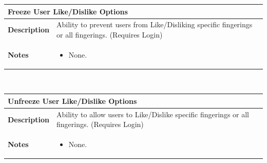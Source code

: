 \documentclass[12pt,english]{article}
\providecommand{\tabularnewline}{\\}
\begin{document}
\begin{tabular}{|p{3cm}|p{13cm}|}
\hline 
\multicolumn{2}{|l|}{\textbf{Freeze User Like/Dislike Options}}\tabularnewline
\hline 
\textbf{Description}  & Ability to prevent users from Like/Disliking specific fingerings or
all fingerings. (Requires Login) \tabularnewline
\hline 
\textbf{Notes}  & \begin{itemize}
\item None. \end{itemize}
\tabularnewline
\hline 
\end{tabular}\\[0.5cm] %
\begin{tabular}{|p{3cm}|p{13cm}|}
\hline 
\multicolumn{2}{|l|}{\textbf{Unfreeze User Like/Dislike Options}}\tabularnewline
\hline 
\textbf{Description}  & Ability to allow users to Like/Dislike specific fingerings or all
fingerings. (Requires Login) \tabularnewline
\hline 
\textbf{Notes}  & \begin{itemize}
\item None. \end{itemize}
\tabularnewline
\hline 
\end{tabular}\\[0.5cm] 
\end{document}
